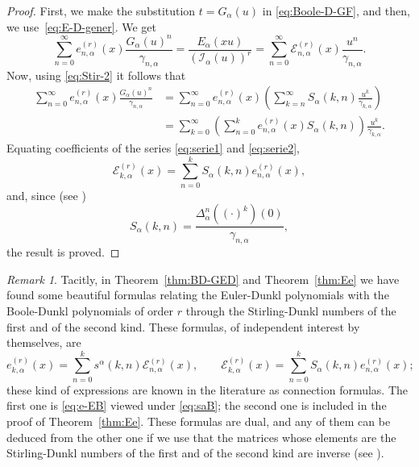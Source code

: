 \documentclass[11pt]{article}
\theoremstyle{plain}
\theoremstyle{remark}
\newtheorem{remark}[theorem]{Remark}
\numberwithin{equation}{section} %
\newcommand{\Ea}{E_{\alpha}}
\newcommand{\I}{\mathcal{I}}
\newcommand{\E}{\mathcal{E}}
\begin{document}
\begin{proof}
First, we make the substitution $t = G_\alpha(u)$ in \eqref{eq:Boole-D-GF}, and then, we use~\eqref{eq:E-D-gener}. We get
\begin{equation}
\label{eq:serie1}
  \sum_{n=0}^{\infty} e_{n,\alpha}^{(r)}(x) \frac{G_\alpha(u)^n}{\gamma_{n,\alpha}} 
  = \frac{\Ea(xu)}{(\I_\alpha(u))^r} 
  = \sum_{n=0}^{\infty} \E_{n,\alpha}^{(r)}(x) \frac{u^n}{\gamma_{n,\alpha}}.
\end{equation}
Now, using \eqref{eq:Stir-2} it follows that
\begin{align}
\nonumber
  \sum_{n=0}^{\infty} e_{n,\alpha}^{(r)}(x) \frac{G_\alpha(u)^n}{\gamma_{n,\alpha}} 
  &= \sum_{n=0}^{\infty} e_{n,\alpha}^{(r)}(x) 
  \left( \sum_{k=n}^{\infty} S_\alpha(k,n) \frac{u^k}{\gamma_{k,\alpha}}\right) \\
\label{eq:serie2}
  &= \sum_{k=0}^{\infty} \left( \sum_{n=0}^{k}e_{n,\alpha}^{(r)}(x) S_\alpha(k,n) \right)
  \frac{u^k}{\gamma_{k,\alpha}}.
\end{align}
Equating coefficients of the series \eqref{eq:serie1} and \eqref{eq:serie2}, 
\[
  \E_{k,\alpha}^{(r)}(x) = \sum_{n=0}^{k} S_\alpha(k,n) e_{n,\alpha}^{(r)}(x),
\]
and, since (see \cite[Theorem~5.3]{ELMV})
\[
  S_\alpha(k,n) = \frac{\Delta_\alpha^n((\cdot)^k)(0)}{\gamma_{n,\alpha}},
\]
the result is proved.
\end{proof}

\begin{remark}
Tacitly, in Theorem~\ref{thm:BD-GED} and Theorem~\ref{thm:Ee} we have found some beautiful formulas relating the Euler-Dunkl polynomials with the Boole-Dunkl polynomials of order $r$ through the Stirling-Dunkl numbers of the first and of the second kind. These formulas, of independent interest by themselves, are
\[
  e_{k,\alpha}^{(r)}(x) = \sum_{n=0}^k s^{\alpha}(k,n)\E_{n,\alpha}^{(r)}(x),
  \qquad
  \E_{k,\alpha}^{(r)}(x) = \sum_{n=0}^k S_{\alpha}(k,n)e_{n,\alpha}^{(r)}(x);
\]
these kind of expressions are known in the literature as connection formulas.
The first one is \eqref{eq:e-EB} viewed under \eqref{eq:saB}; the second one is included in the proof of Theorem~\ref{thm:Ee}. 
These formulas are dual, and any of them can be deduced from the other one if we use that the matrices whose elements are the Stirling-Dunkl numbers of the first and of the second kind are inverse (see \cite[Theorem~4.1]{MV2}).
\end{remark}
\end{document}
